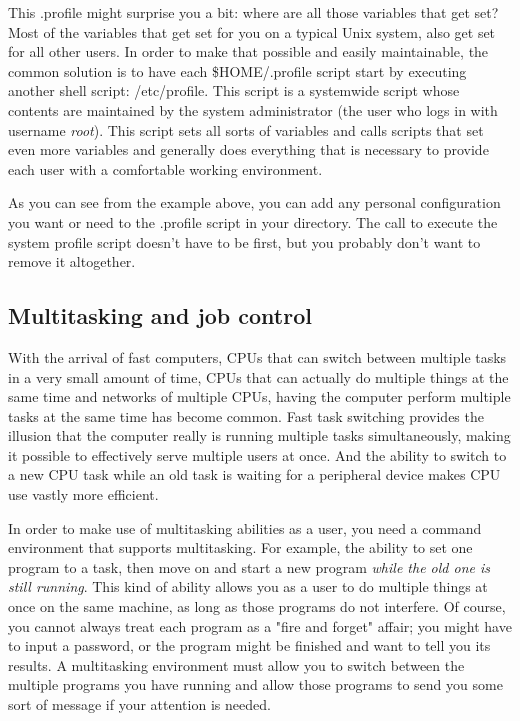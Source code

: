 This .profile might surprise you a bit: where are all those variables that get
set? Most of the variables that get set for you on a typical Unix system, also
get set for all other users. In order to make that possible and easily
maintainable, the common solution is to have each \$HOME/.profile script start
by executing another shell script: /etc/profile. This script is a
systemwide script whose contents are maintained by the system administrator
(the user who logs in with username \textit{root}). This script sets all sorts
of variables and calls scripts that set even more variables and generally does
everything that is necessary to provide each user with a comfortable working
environment.

As you can see from the example above, you can add any personal configuration
you want or need to the .profile script in your directory. The call to execute
the system profile script doesn't have to be first, but you probably don't want
to remove it altogether.

\subsection{Multitasking and job control}
With the arrival of fast computers, CPUs that can switch between multiple tasks
in a very small amount of time, CPUs that can actually do multiple things at
the same time and networks of multiple CPUs, having the computer perform
multiple tasks at the same time has become common. Fast task switching provides
the illusion that the computer really is running multiple tasks simultaneously,
making it possible to effectively serve multiple users at once. And the ability
to switch to a new CPU task while an old task is waiting for a peripheral
device makes CPU use vastly more efficient.

In order to make use of multitasking abilities as a user, you need a command
environment that supports multitasking. For example, the ability to set one
program to a task, then move on and start a new program \textit{while the old
one is still running}. This kind of ability allows you as a user to do multiple
things at once on the same machine, as long as those programs do not interfere.
Of course, you cannot always treat each program as a "fire and forget" affair;
you might have to input a password, or the program might be finished and want
to tell you its results. A multitasking environment must allow you to switch
between the multiple programs you have running and allow those programs to send
you some sort of message if your attention is needed.

